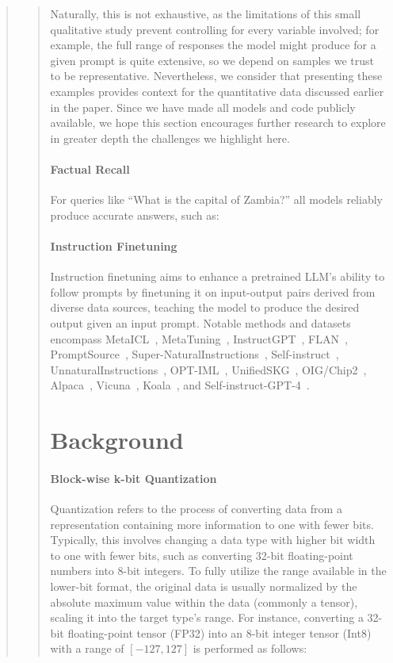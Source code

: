 \begin{quote}
\begin{quote}
Naturally, this is not exhaustive, as the limitations of this small qualitative study prevent controlling for every variable involved; for example, the full range of responses the model might produce for a given prompt is quite extensive, so we depend on samples we trust to be representative. Nevertheless, we consider that presenting these examples provides context for the quantitative data discussed earlier in the paper. Since we have made all models and code publicly available, we hope this section encourages further research to explore in greater depth the challenges we highlight here.  
\paragraph{Factual Recall} For queries like ``What is the capital of Zambia?'' all models reliably produce accurate answers, such as:

\paragraph{Instruction Finetuning} Instruction finetuning aims to enhance a pretrained LLM’s ability to follow prompts by finetuning it on input-output pairs derived from diverse data sources, teaching the model to produce the desired output given an input prompt. Notable methods and datasets encompass MetaICL~\citep{min2021metaicl}, MetaTuning~\citep{zhong2021adapting}, InstructGPT~\citep{ouyang2022training}, FLAN~\citep{wei2021finetuned,chung2022scaling}, PromptSource~\citep{bach2022promptsource}, Super-NaturalInstructions~\citep{wang2022super,sanh2021multitask}, Self-instruct~\citep{wang2022self}, UnnaturalInstructions~\citep{honovich2022unnatural}, OPT-IML~\citep{iyer2022opt}, UnifiedSKG~\citep{xie2022unifiedskg}, OIG/Chip2~\citep{laion2023}, Alpaca~\citep{alpaca}, Vicuna~\citep{vicuna2023}, Koala~\citep{koala_blogpost_2023}, and Self-instruct-GPT-4~\citep{peng2023instruction}.

\section{Background}
\paragraph{Block-wise k-bit Quantization} Quantization refers to the process of converting data from a representation containing more information to one with fewer bits. Typically, this involves changing a data type with higher bit width to one with fewer bits, such as converting 32-bit floating-point numbers into 8-bit integers. To fully utilize the range available in the lower-bit format, the original data is usually normalized by the absolute maximum value within the data (commonly a tensor), scaling it into the target type’s range. For instance, converting a 32-bit floating-point tensor (FP32) into an 8-bit integer tensor (Int8) with a range of $[-127, 127]$ is performed as follows:


\end{quote}
\end{quote}

